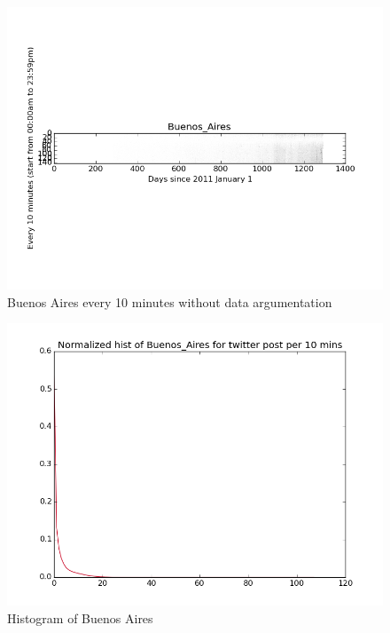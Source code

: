 \documentclass[a4paper,12pt]{article}
\begin{document}
\begin{figure}[H]
  \begin{center}
      \includegraphics[scale=0.8]{1Buenos_Aires.png}
\end{center}
\caption{Buenos Aires every 10 minutes without data argumentation}
 \label {fig:2}
 \end{figure}



\begin{figure}[H]
  \begin{center}
      \includegraphics[scale=0.8]{1Buenos_Aireshisto.png}
\end{center}
\caption{Histogram of Buenos Aires}
 \label {fig:2}
 \end{figure}
\end{document}

